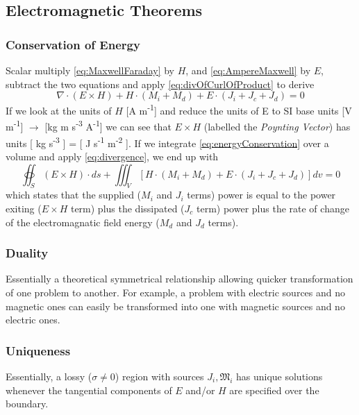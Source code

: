 \documentclass{article}
\numberwithin{equation}{section}
\begin{document}
    \subsection{Electromagnetic Theorems}
        \subsubsection{Conservation of Energy}
            Scalar multiply \eqref{eq:MaxwellFaraday} by $H$, and
            \eqref{eq:AmpereMaxwell} by $E$, subtract the two equations and apply
            \eqref{eq:divOfCurlOfProduct} to derive
            \begin{equation} \label{eq:energyConservation}
                \nabla \cdot ( E \times H) + H \cdot ( M_i + M_d ) + E \cdot ( J_i + J_c
                + J_d ) = 0
            \end{equation}
            If we look at the units of $H$ [A m\textsuperscript{-1}] and reduce the
            units of E to SI base units [V m\textsuperscript{-1}] $\to$ [kg m
            s\textsuperscript{-3} A\textsuperscript{-1}] we can see that $E \times H$
            (labelled the \emph{Poynting Vector}) has units [ kg s\textsuperscript{-3} ]
            = [ J s\textsuperscript{-1} m\textsuperscript{-2} ]. If we integrate
            \eqref{eq:energyConservation} over a volume and apply \eqref{eq:divergence},
            we end up with
            \begin{equation} \label{eq:energyConservationIntegral}
                \oiint_S ( E \times H) \cdot ds + \iiint_V [ H \cdot ( M_i + M_d ) + E
                \cdot ( J_i + J_c + J_d )] dv = 0
            \end{equation}
            which states that the supplied ($M_i$ and $J_i$ terms) power is equal to the
            power exiting ($E \times H$ term) plus the dissipated ($J_c$ term) power
            plus the rate of change of the electromagnatic field energy ($M_d$ and $J_d$
            terms).
        \subsubsection{Duality}
            Essentially a theoretical symmetrical relationship allowing quicker
            transformation of one problem to another. For example, a problem with
            electric sources and no magnetic ones can easily be transformed into one
            with magnetic sources and no electric ones.
        \subsubsection{Uniqueness}
            Essentially, a lossy ($\sigma \neq 0$) region with sources $J_i,
            \mathfrak{M}_i$ has unique solutions whenever the tangential components of
            $E$ and/or $H$ are specified over the boundary.
\end{document}
